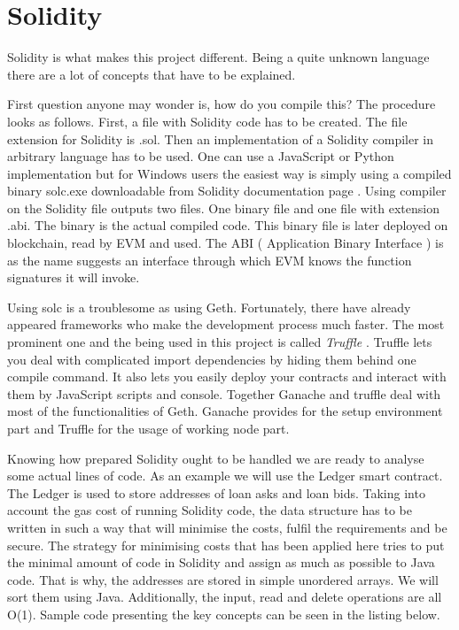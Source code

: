 \documentclass[a4paper,12pt,twoside,openany]{report}
\begin{document}
\section{Solidity} \label{solidity}

Solidity is what makes this project different. Being a quite unknown language there are a lot of concepts that have to be explained.

First question anyone may wonder is, how do you compile this? The procedure looks as follows. First, a file with Solidity code has to be created. The file extension for Solidity is .sol. Then an implementation  of a Solidity compiler in arbitrary language has to be used. One can use a JavaScript or Python implementation but for Windows users the easiest way is simply using a compiled binary solc.exe downloadable from Solidity documentation page \cite{solc}. Using compiler on the Solidity file outputs two files. One binary file and one file with extension .abi. The binary is the actual compiled code. This binary file is later deployed on blockchain, read by EVM and used. The ABI ( Application Binary Interface ) is as the name suggests an interface through which EVM knows the function signatures it will invoke. 

Using solc is a troublesome as using Geth. Fortunately, there have already appeared frameworks who make the development process much faster. The most prominent one and the being used in this project is called \textit{Truffle} \cite{truffle}. Truffle lets you deal with complicated import dependencies by hiding them behind one compile command. It also lets you easily deploy your contracts and interact with them by JavaScript scripts and console. Together Ganache and truffle deal with most of the functionalities of Geth. Ganache provides for the setup environment part and Truffle for the usage of working node part.

Knowing how prepared Solidity ought to be handled we are ready to analyse some actual lines of code.
As an example we will use the Ledger smart contract. The Ledger is used to store addresses of loan asks and loan bids. Taking into account the gas cost of running Solidity code, the data structure has to be written in such a way that will minimise the costs, fulfil the requirements and be secure. The strategy for minimising costs that has been applied here tries to put the minimal amount of code in Solidity and assign as much as possible to Java code. That is why, the addresses are stored in simple unordered arrays. We will sort them using Java. Additionally, the input, read and delete operations are all O(1). Sample code presenting the key concepts can be seen in the listing below.
\end{document}
